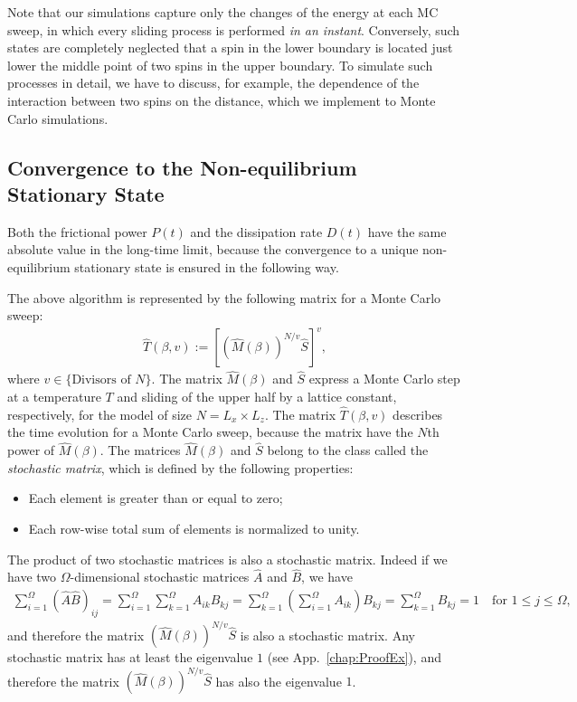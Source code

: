Note that our simulations capture only the changes of the energy at each MC sweep, in which every sliding process is performed \textit{in an instant}. Conversely, such states are completely neglected that a spin in the lower boundary is located just lower the middle point of two spins in the upper boundary.  To simulate such processes in detail, we have to discuss, for example, the dependence of the interaction between two spins on the distance, which we implement to Monte Carlo simulations.

\subsection{Convergence to the Non-equilibrium Stationary State}\label{subsec:convproof}

Both the frictional power $P(t)$ and the dissipation rate $D(t)$ have the same absolute value in the long-time limit, because the convergence to a unique non-equilibrium stationary state is ensured in the following  way.

The above algorithm is represented by the following matrix for a Monte Carlo sweep:
\begin{align}
\hat{T}(\beta,v):=\left[\left(\hat{M}(\beta)\right)^{N/v}\hat{S}\right]^{v},
\end{align}
where $v\in\{\text{Divisors of }N\}$. The matrix $\hat{M}(\beta)$ and $\hat{S}$ express a Monte Carlo step at a temperature $T$ and sliding of the upper half by a lattice constant, respectively, for the model of size $N=L_{x}\times L_{z}$. The matrix $\hat{T}(\beta,v)$ describes the time evolution for a Monte Carlo sweep, because the matrix have the $N$th power of $\hat{M}(\beta)$. The matrices $\hat{M}(\beta)$ and $\hat{S}$ belong to the class called the \textit{stochastic matrix}, which is defined by the following properties:
\begin{itemize}
	\item Each element is greater than or equal to zero;
	\item Each row-wise total sum of elements is normalized to unity.
\end{itemize}
The product of two stochastic matrices is also a stochastic matrix. Indeed if we have two $\Omega$-dimensional stochastic matrices $\hat{A}$ and $\hat{B}$, we have
\begin{align}
\sum_{i=1}^{\Omega}(\hat{A}\hat{B})_{ij} = \sum_{i=1}^{\Omega}\sum_{k=1}^{\Omega}A_{ik}B_{kj} = \sum_{k=1}^{\Omega}\left(\sum_{i=1}^{\Omega}A_{ik}\right)B_{kj} = \sum_{k=1}^{\Omega}B_{kj} = 1 \quad\text{for $1\leq j\leq \Omega$},
\end{align}
and therefore the matrix $\left(\hat{M}(\beta)\right)^{N/v}\hat{S}$ is also a stochastic matrix. Any stochastic matrix has at least the eigenvalue $1$ (see App.~\ref{chap:ProofEx}), and therefore the matrix $\left(\hat{M}(\beta)\right)^{N/v}\hat{S}$ has also the eigenvalue $1$.

